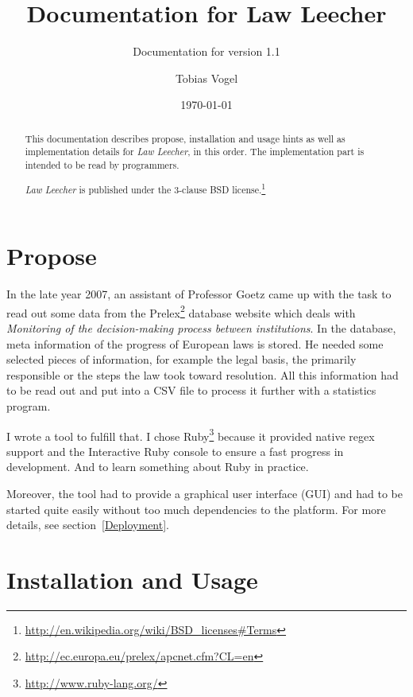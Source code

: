 \documentclass{scrartcl}
\title{Documentation for Law Leecher}
\subtitle{Documentation for version 1.1}
\author{Tobias Vogel}
\date{\today}
\begin{document}
\maketitle

\begin{abstract}
This documentation describes propose, installation and usage hints as well as implementation details for \textit{Law Leecher}, in this order. The implementation part is intended to be read by programmers.

\textit{Law Leecher} is published under the 3-clause BSD license.\footnote{\url{http://en.wikipedia.org/wiki/BSD_licenses#Terms}}
\end{abstract}


\tableofcontents

\section{Propose}
In the late year 2007, an assistant of Professor Goetz came up with the task to read out some data from the Prelex\footnote{\url{http://ec.europa.eu/prelex/apcnet.cfm?CL=en}} database website which deals with \textit{Monitoring of the decision-making process between institutions}. In the database, meta information of the progress of European laws is stored. He needed some selected pieces of information, for example the legal basis, the primarily responsible or the steps the law took toward resolution. All this information had to be read out and put into a CSV file to process it further with a statistics program.

I wrote a tool to fulfill that. I chose Ruby\footnote{\url{http://www.ruby-lang.org/}} because it provided native regex support and the Interactive Ruby console to ensure a fast progress in development. And to learn something about Ruby in practice.

Moreover, the tool had to provide a graphical user interface (GUI) and had to be started quite easily without too much dependencies to the platform. For more details, see section~\ref{Deployment}.



\section{Installation and Usage}
\end{document}
